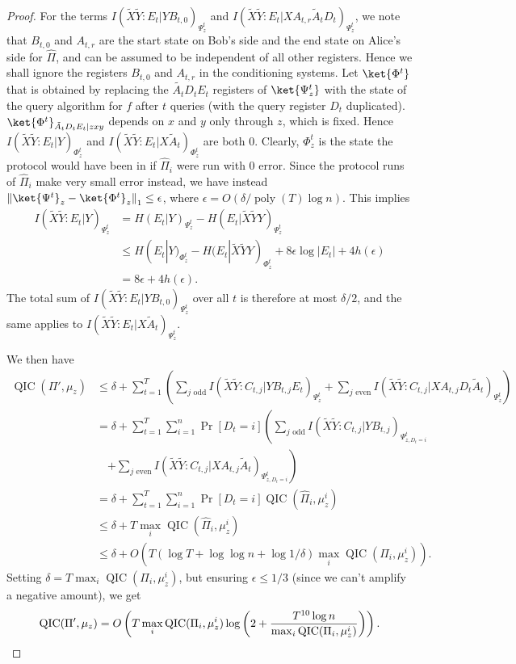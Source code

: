 \documentclass[10pt,a4paper]{article}
\theoremstyle{definition}
\DeclareMathOperator{\poly}{poly}
\renewcommand{\>}{\rangle}
\newcommand{\<}{\langle}
\newcommand{\tX}{\widetilde{X}}
\newcommand{\tY}{\widetilde{Y}}
\newcommand{\norm}[1]{{\left\lVert#1\right\rVert}}
\DeclareMathOperator{\QIC}{QIC}
\begin{document}
\begin{proof}
For the terms $I(\tX\tY:E_t|YB_{t,0})_{\Psi^t_z}$ and $I(\tX\tY:E_t|XA_{t,r}\tilde{A}_tD_t)_{\Psi^t_z}$, we note that $B_{t,0}$ and $A_{t,r}$ are the start state on Bob's side and the end state on Alice's side for $\hat{\Pi}$, and can be assumed to be independent of all other registers. Hence we shall ignore the registers $B_{t,0}$ and $A_{t,r}$ in the conditioning systems. Let $\ket{\Phi^t}$ that is obtained by replacing the $\tilde{A_t}D_tE_t$ registers of $\ket{\Psi^t_z}$ with the state of the query algorithm for $f$ after $t$ queries (with the query register $D_t$ duplicated). $\ket{\Phi^t}_{\tilde{A}_tD_tE_t|zxy}$ depends on $x$ and $y$ only through $z$, which is fixed. Hence $I(\tX\tY:E_t|Y)_{\Phi^t_z}$ and $I(\tX\tY:E_t|X\tilde{A}_t)_{\Phi^t_z}$ are both 0. Clearly, $\Phi^t_z$ is the state the protocol would have been in if $\hat{\Pi}_i$ were run with 0 error. Since the protocol runs of $\hat{\Pi}_i$
make very small error instead, we have instead $\norm{\ket{\Psi^t}_z - \ket{\Phi^t}_z}_1 \leq \epsilon$,
where $\epsilon=O(\delta/\poly(T)\log n)$. This implies
\begin{align*}
I(\tX\tY:E_t|Y)_{\Psi^t_z} & = H(E_t|Y)_{\Psi^t_z} - H(E_t|\tX\tY Y)_{\Psi^t_z} \\
 & \leq H(E_t|Y)_{\Phi^t_z} - H(E_t|\tX\tY Y)_{\Phi^t_z} + 8\epsilon\log|E_t| + 4h(\epsilon) \\
 & = 8\epsilon + 4h(\epsilon).
\end{align*}
The total sum of
$I(\tX\tY:E_t|YB_{t,0})_{\Psi^t_z}$ over all $t$ is therefore at most $\delta/2$, and the same applies to $I(\tX\tY:E_t|X\tilde{A}_t)_{\Psi^t_z}$.

We then have
\begin{align*}
\QIC(\Pi',\mu_z)&\le \delta+\sum_{t=1}^T
\left(\sum_{j\text{ odd}} I(\tX\tY:C_{t,j}|YB_{t,j}E_t)_{\Psi^t_z}
    +\sum_{j\text{ even}} I(\tX\tY:C_{t,j}|XA_{t,j}D_t\tilde{A}_t)_{\Psi^t_z}\right)\\
&=\delta+ \sum_{t=1}^T\sum_{i=1}^n\Pr[D_t=i]\left(
    \sum_{j\text{ odd}} I(\tX\tY:C_{t,j}|YB_{t,j})_{\Psi^t_{z,D_t=i}} \right. \\
&   \quad \left. +\sum_{j\text{ even}} I(\tX\tY:C_{t,j}|XA_{t,j}\tilde{A}_t)_{\Psi^t_{z,D_t=i}}\right)\\
&=\delta+\sum_{t=1}^T\sum_{i=1}^n \Pr[D_t=i]\QIC(\hat{\Pi}_i,\mu^i_z)\\
&\le\delta+ T\max_i\QIC(\hat{\Pi}_i,\mu^i_z)\\
&\le\delta+ O(T(\log T+\log\log n+\log 1/\delta)\max_i\QIC(\Pi_i,\mu^i_z)).
\end{align*}
Setting $\delta= T\max_i\QIC(\Pi_i,\mu^i_z)$, but ensuring
$\epsilon\le 1/3$ (since we can't amplify a negative amount), we get
\[\QIC(\Pi',\mu_z)=O\left(T\max_i\QIC(\Pi_i,\mu^i_z)
\log\left(2+\frac{T^{10}\log n}{\max_i\QIC(\Pi_i,\mu^i_z)}\right)\right).
\qedhere\]
\end{proof}
\end{document}
